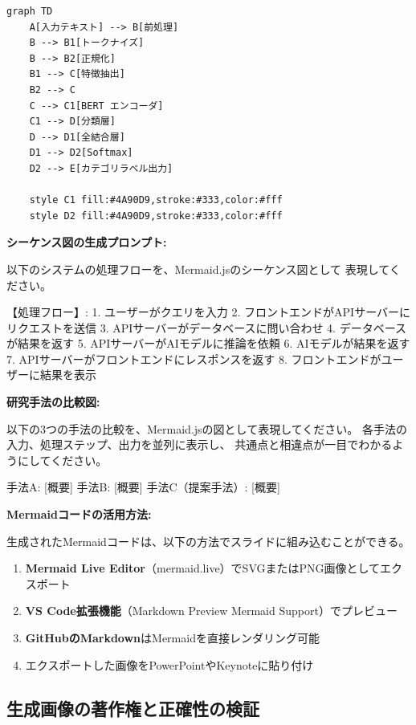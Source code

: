 \begin{lstlisting}[language={}]
graph TD
    A[入力テキスト] --> B[前処理]
    B --> B1[トークナイズ]
    B --> B2[正規化]
    B1 --> C[特徴抽出]
    B2 --> C
    C --> C1[BERT エンコーダ]
    C1 --> D[分類層]
    D --> D1[全結合層]
    D1 --> D2[Softmax]
    D2 --> E[カテゴリラベル出力]

    style C1 fill:#4A90D9,stroke:#333,color:#fff
    style D2 fill:#4A90D9,stroke:#333,color:#fff
\end{lstlisting}

\textbf{シーケンス図の生成プロンプト:}

\begin{promptbox}
以下のシステムの処理フローを、Mermaid.jsのシーケンス図として
表現してください。

【処理フロー】:
1. ユーザーがクエリを入力
2. フロントエンドがAPIサーバーにリクエストを送信
3. APIサーバーがデータベースに問い合わせ
4. データベースが結果を返す
5. APIサーバーがAIモデルに推論を依頼
6. AIモデルが結果を返す
7. APIサーバーがフロントエンドにレスポンスを返す
8. フロントエンドがユーザーに結果を表示
\end{promptbox}

\textbf{研究手法の比較図:}

\begin{promptbox}
以下の3つの手法の比較を、Mermaid.jsの図として表現してください。
各手法の入力、処理ステップ、出力を並列に表示し、
共通点と相違点が一目でわかるようにしてください。

手法A: [概要]
手法B: [概要]
手法C（提案手法）: [概要]
\end{promptbox}

\textbf{Mermaidコードの活用方法:}

生成されたMermaidコードは、以下の方法でスライドに組み込むことができる。

\begin{enumerate}
\item \textbf{Mermaid Live Editor}（mermaid.live）でSVGまたはPNG画像としてエクスポート
\item \textbf{VS Code拡張機能}（Markdown Preview Mermaid Support）でプレビュー
\item \textbf{GitHubのMarkdown}はMermaidを直接レンダリング可能
\item エクスポートした画像をPowerPointやKeynoteに貼り付け
\end{enumerate}

\subsection{生成画像の著作権と正確性の検証}

